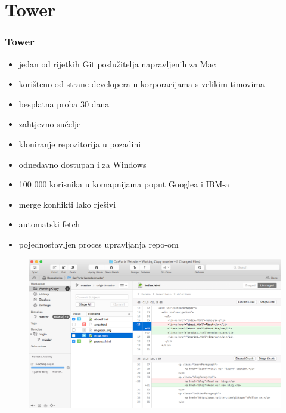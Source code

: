 \section{Tower}
\begin{frame}[allowframebreaks]
\frametitle{Tower}
 
\begin{itemize}
 \item jedan od rijetkih Git poslužitelja napravljenih za Mac
 \item korišteno od strane developera u korporacijama s velikim timovima
 \item besplatna proba 30 dana
 \item zahtjevno sučelje
 \item kloniranje repozitorija u pozadini
 \item odnedavno dostupan i za Windows
 \framebreak
 \item 100 000 korisnika u komapnijama poput Googlea i IBM-a
 \item merge konflikti lako rješivi
 \item automatski fetch
 \item pojednostavljen proces upravljanja repo-om
\end{itemize}

\begin{figure}
	\includegraphics[width=0.9\linewidth]{images/tower-gitt.png}
\end{figure}
\end{frame}

